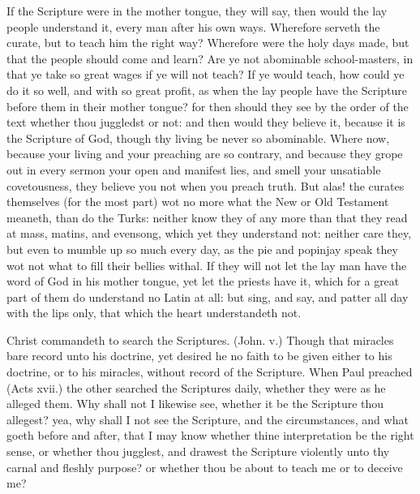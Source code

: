 If the Scripture were in the mother tongue,
they will say, then would the lay people understand
it, every man after his own ways. Wherefore
serveth the curate, but to teach him the 
right way? Wherefore were the holy days 
made, but that the people should come and learn? 
Are ye not abominable school-masters, in that ye 
take so great wages if ye will not teach? If ye 
would teach, how could ye do it so well, and 
with so great profit, as when the lay people have 
the Scripture before them in their mother tongue?
for then should they see by the order of the text 
whether thou juggledst or not: and then would 
they believe it, because it is the Scripture of God, 
though thy living be never so abominable.
Where now, because your living and your 
preaching are so contrary, and because they 
grope out in every sermon your open and manifest
lies, and smell your unsatiable covetousness,
they believe you not when you preach truth. 
But alas! the curates themselves (for the most 
part) wot no more what the New or Old Testament
meaneth, than do the Turks: neither know 
they of any more than that they read at mass, 
matins, and evensong, which yet they understand
not: neither care they, but even to mumble 
up so much every day, as the pie and popinjay 
speak they wot not what to fill their bellies 
withal. If they will not let the lay man have 
the word of God in his mother tongue, yet let 
the priests have it, which for a great part of them 
do understand no Latin at all: but sing, and say, 
and patter all day with the lips only, that which 
the heart understandeth not. 


Christ commandeth to search the Scriptures.
(John. v.) Though that miracles bare record 
unto his doctrine, yet desired he no faith to be 
given either to his doctrine, or to his miracles,
without record of the Scripture. When 
Paul preached (Acts xvii.) the other searched 
the Scriptures daily, whether they were as he 
alleged them. Why shall not I likewise see, whether
it be the Scripture thou allegest? yea, why 
shall I not see the Scripture, and the circumstances, 
and what goeth before and after, that I may 
know whether thine interpretation be the right 
sense, or whether thou jugglest, and drawest the 
Scripture violently unto thy carnal and fleshly 
purpose? or whether thou be about to teach me 
or to deceive me? 

